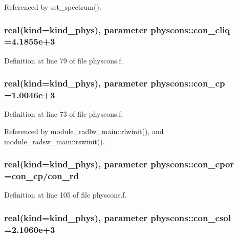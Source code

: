 Referenced by set\+\_\+spectrum().

\subsubsection[{\texorpdfstring{con\+\_\+cliq}{con_cliq}}]{\setlength{\rightskip}{0pt plus 5cm}real(kind=kind\+\_\+phys), parameter physcons\+::con\+\_\+cliq =4.\+1855e+3}\hypertarget{namespacephyscons_a63660b93c455c1f072ade649bf87cadc}{}\label{namespacephyscons_a63660b93c455c1f072ade649bf87cadc}


Definition at line 79 of file physcons.\+f.

\subsubsection[{\texorpdfstring{con\+\_\+cp}{con_cp}}]{\setlength{\rightskip}{0pt plus 5cm}real(kind=kind\+\_\+phys), parameter physcons\+::con\+\_\+cp =1.\+0046e+3}\hypertarget{namespacephyscons_a29704d9a27091d61724e1a0c654d0f10}{}\label{namespacephyscons_a29704d9a27091d61724e1a0c654d0f10}


Definition at line 73 of file physcons.\+f.



Referenced by module\+\_\+radlw\+\_\+main\+::rlwinit(), and module\+\_\+radsw\+\_\+main\+::rswinit().

\subsubsection[{\texorpdfstring{con\+\_\+cpor}{con_cpor}}]{\setlength{\rightskip}{0pt plus 5cm}real(kind=kind\+\_\+phys), parameter physcons\+::con\+\_\+cpor ={\bf con\+\_\+cp}/{\bf con\+\_\+rd}}\hypertarget{namespacephyscons_aa70e90bc808832d61159e7ecda5212c5}{}\label{namespacephyscons_aa70e90bc808832d61159e7ecda5212c5}


Definition at line 105 of file physcons.\+f.

\subsubsection[{\texorpdfstring{con\+\_\+csol}{con_csol}}]{\setlength{\rightskip}{0pt plus 5cm}real(kind=kind\+\_\+phys), parameter physcons\+::con\+\_\+csol =2.\+1060e+3}\hypertarget{namespacephyscons_afad2954199233ac4d97f3f690e255836}{}\label{namespacephyscons_afad2954199233ac4d97f3f690e255836}


